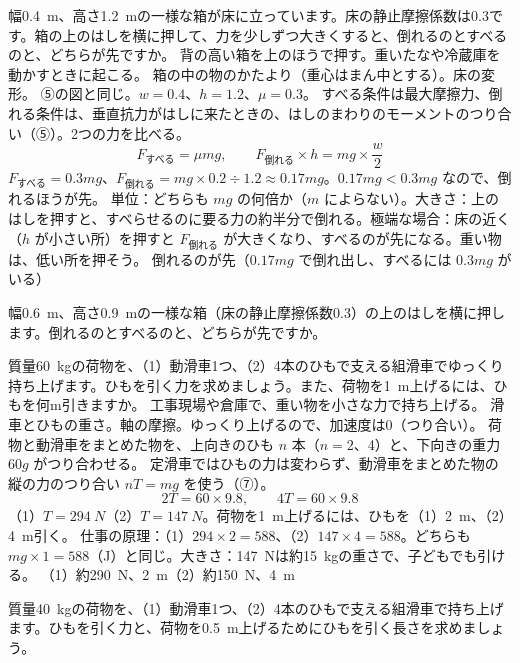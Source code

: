 \begin{phreidai}
\label{ph:力-5:ex7}幅\qty{0.4}{m}、高さ\qty{1.2}{m}の一様な箱が床に立っています。床の静止摩擦係数は0.3です。箱の上のはしを横に押して、力を少しずつ大きくすると、倒れるのとすべるのと、どちらが先ですか。
\phbamen
背の高い箱を上のほうで押す。重いたなや冷蔵庫を動かすときに起こる。
\phmushi
箱の中の物のかたより（重心はまん中とする）。床の変形。
\phzu
⑤の図と同じ。$w=0.4$、$h=1.2$、$\mu=0.3$。
\phriyu
すべる条件は最大摩擦力、倒れる条件は、垂直抗力がはしに来たときの、はしのまわりのモーメントのつり合い（⑤）。2つの力を比べる。
\phtateru
\[ F_{\text{すべる}}=\mu mg,\qquad F_{\text{倒れる}}\times h=mg\times\frac{w}{2} \]
\phtoku
$F_{\text{すべる}}=0.3mg$、$F_{\text{倒れる}}=mg\times0.2\div1.2\approx0.17mg$。$0.17mg<0.3mg$ なので、倒れるほうが先。
\phtashikame
単位：どちらも $mg$ の何倍か（$m$ によらない）。\quad 大きさ：上のはしを押すと、すべらせるのに要る力の約半分で倒れる。\quad 極端な場合：床の近く（$h$ が小さい所）を押すと $F_{\text{倒れる}}$ が大きくなり、すべるのが先になる。重い物は、低い所を押そう。
\kotae 倒れるのが先（$0.17mg$ で倒れ出し、すべるには $0.3mg$ がいる）
\end{phreidai}
\begin{jibun}
幅\qty{0.6}{m}、高さ\qty{0.9}{m}の一様な箱（床の静止摩擦係数0.3）の上のはしを横に押します。倒れるのとすべるのと、どちらが先ですか。
\end{jibun}

\begin{phreidai}[動滑車と組滑車]
\label{ph:力-5:ex8}質量\qty{60}{kg}の荷物を、（1）動滑車1つ、（2）4本のひもで支える組滑車でゆっくり持ち上げます。ひもを引く力を求めましょう。また、荷物を\qty{1}{m}上げるには、ひもを何m引きますか。
\phbamen
工事現場や倉庫で、重い物を小さな力で持ち上げる。
\phmushi
滑車とひもの重さ。軸の摩擦。ゆっくり上げるので、加速度は0（つり合い）。
\phzu
荷物と動滑車をまとめた物を、上向きのひも $n$ 本（$n=2$、4）と、下向きの重力 $60g$ がつり合わせる。
\phriyu
定滑車ではひもの力は変わらず、動滑車をまとめた物の縦の力のつり合い $nT=mg$ を使う（⑦）。
\phtateru
\[ 2T=60\times9.8,\qquad 4T=60\times9.8 \]
\phtoku
（1）$T=\qty{294}{N}$\quad（2）$T=\qty{147}{N}$。荷物を\qty{1}{m}上げるには、ひもを（1）\qty{2}{m}、（2）\qty{4}{m}引く。
\phtashikame
仕事の原理：（1）$294\times2=588$、（2）$147\times4=588$。どちらも $mg\times1=588$（J）と同じ。\quad 大きさ：\qty{147}{N}は約\qty{15}{kg}の重さで、子どもでも引ける。
\kotae （1）約\qty{290}{N}、\qty{2}{m}\quad（2）約\qty{150}{N}、\qty{4}{m}
\end{phreidai}
\begin{jibun}
質量\qty{40}{kg}の荷物を、（1）動滑車1つ、（2）4本のひもで支える組滑車で持ち上げます。ひもを引く力と、荷物を\qty{0.5}{m}上げるためにひもを引く長さを求めましょう。
\end{jibun}

